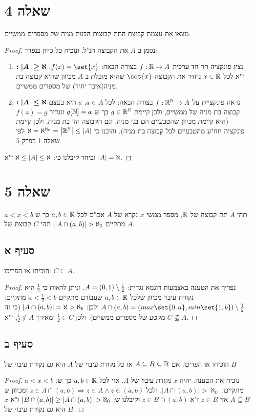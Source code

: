 \documentclass{article}
\DeclarePairedDelimiter\set\{\}
\begin{document}
	\section*{שאלה 4}
	מצאו את עצמת קבוצת התת קבוצות הבנות מניה של מספרים ממשיים.
	\begin{proof}
		נסמן ב $A$ את הקבוצה הנ"ל. ונוכיח כל כיוון בנפרד:
		\begin{enumerate}
			\item $\boldsymbol{:\left| A \right| \geq \aleph}$
			 נציג פונקציה חד חד ערכית $f: \mathbb{R} \rightarrow A$ בצורה הבאה: $f(x) = \set{x}$, ז"א לכל $x \in \mathbb{R}$ נחזיר את הקבוצה $\set{x}$ שהיא מוכלת ב $A$ מכיוון שהיא קבוצה בת מניה(איבר יחיד) של מספרים ממשיים.
			 \item $\boldsymbol{:\left| A \right| \leq \aleph}$ נראה פונקציית על $f: \mathbb{R}^{\mathbb{N}} \rightarrow A$ בצורה הבאה: לכל $a \in A$, $a$ היא בעצם קבוצה בת מניה של ממשיים, ולכן קיימת $g \in \mathbb{R}^{\mathbb{N}}$ כך ש $g[\mathbb{N}] = a$ ונגדיר $f(a) = g$ (היא קיימת מכיוון שהטבעיים הם בני מניה, וגם הקבוצה הזו בת מניה, ולכן קיימת פונקציה חח"ע  מהטבעיים לכל קבוצה בת מניה).
			 והוכנו כי $\aleph = \aleph^{\aleph_0} = \left| \mathbb{R}^{\mathbb{N}} \right| \leq \left| A \right|$ לפי שאלה 1 בפרק 5.
		\end{enumerate}
		וביחד קיבלנו כי: $\aleph \leq \left| A \right| \leq \aleph$ ז"א $\left| A \right| = \aleph$.
	\end{proof}


	\pagebreak
	\section*{שאלה 5}
	תהי $A$ תת קבוצה של $\mathbb{R}$, מספר ממשי $x$ נקרא  של $A$ אם"ם לכל $a, b \in \mathbb{R}$ כך ש $a < x < b$ מתקיים $\left| A \cap \left( a,b \right) \right| > \aleph_0$.
	תהי $C$ קבוצת  של $A$.
	\subsection*{סעיף א}
	הוכיחו או הפריכו: $C \subseteq A$.
	\begin{proof}
		נפריך את הטענה באצמעות דוגמא נגדית: $A = (0, 1) \setminus \frac{1}{2}$.
		וניתן לראות כי $\frac{1}{2}$ היא נקודת עיבוי מכיוון שלכל $a, b \in \mathbb{R}$ שעבורם מתקיים $a < \frac{1}{2} < b$
		מתקיים: $A \cap (a,b) = (max\set{0,a}, min\set{1, b}) \sub \frac{1}{2}$ ולכן: $\left| A \cap (a,b) \right| = \aleph > \aleph_0$ (כי זה מקטע של מספרים ממשיים).
		ולכן $\frac{1}{2} \in C$ ומאידך $\frac{1}{2} \not\in A$, ז"א $C \not\subseteq A$.
	\end{proof}

	\subsection*{סעיף ב}
	הוכיחו או הפריכו: אם $A \subseteq B \subseteq \mathbb{R}$ אז כל נקודת עיבוי של $A$ היא גם נקודת עיבוי של $B$
	\begin{proof}
		נוכיח את הטענה: יהיה $x$ נקודת עיבוי של $A$, אזי לכל $a,b \in \mathbb{R}$ כך ש: $a < x < b$ מתקיים:
		$|A \cap (a,b)| > \aleph_0$, ולכל $z \in A \cap (a,b) \Rightarrow z \in A \land z \in (a,b)$  ומכיוון ש $A \subseteq B$ אזי $z \in B$ ז"א $z \in B \cap (a,b)$
		וקיבלנו ש: $\left| B \cap (a,b) \right| \geq \left| A \cap (a,b) \right| > \aleph_0$ ז"א $x$ היא גם נקודת עיבוי של $B$.
	\end{proof}
\end{document}
